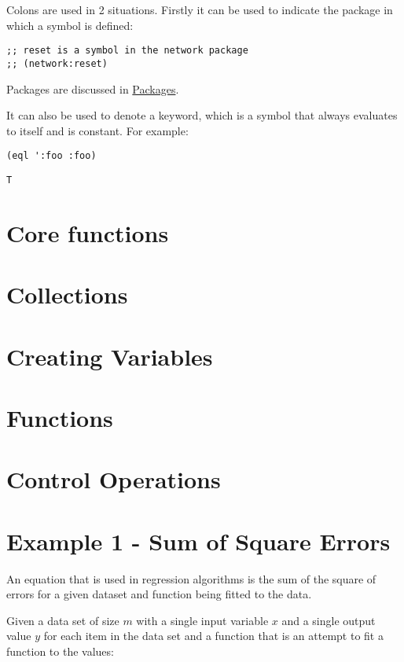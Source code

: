 \documentclass[11pt]{article}
\begin{document}
Colons are used in 2 situations. Firstly it can be used to indicate
the package in which a symbol is defined:

\begin{verbatim}
;; reset is a symbol in the network package
;; (network:reset)
\end{verbatim}

Packages are discussed in \hyperref[sec-13]{Packages}.

It can also be used to denote a keyword, which is a symbol that
always evaluates to itself and is constant. For example:

\begin{verbatim}
(eql ':foo :foo)
\end{verbatim}
\begin{verbatim}
T
\end{verbatim}

\section{Core functions}
\label{sec-3}
\section{Collections}
\label{sec-4}
\section{Creating Variables}
\label{sec-5}
\section{Functions}
\label{sec-6}
\section{Control Operations}
\label{sec-7}
\section{Example 1 - Sum of Square Errors}
\label{sec-8}

An equation that is used in regression algorithms is the sum of
the square of errors for a given dataset and function being fitted
to the data.

Given a data set of size $m$ with a single input variable $x$ and a
single output value $y$ for each item in the data set
and a function that is an attempt to fit a function to the values:
\end{document}
